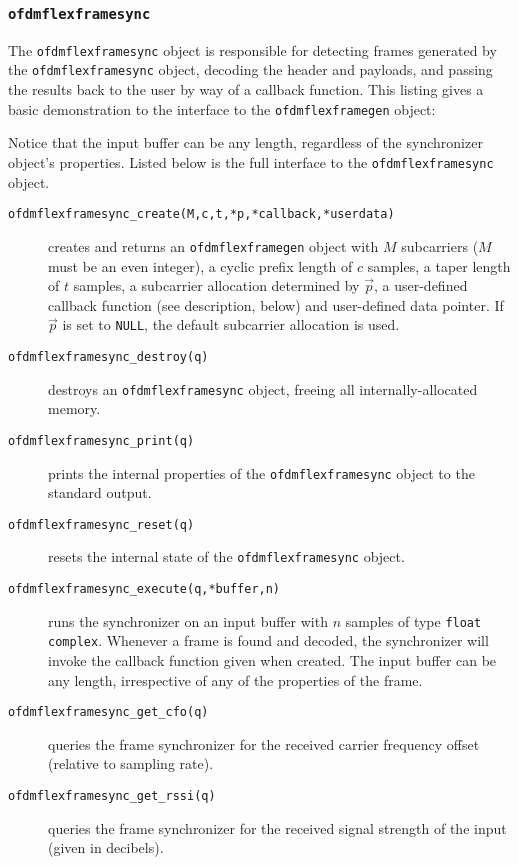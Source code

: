 \subsubsection{{\tt ofdmflexframesync}}
\label{module:framing:ofdmflexframe:sync}
%
The {\tt ofdmflexframesync} object is responsible for detecting frames
generated by the {\tt ofdmflexframesync} object, decoding the header and
payloads, and passing the results back to the user by way of a callback
function.
%
This listing gives a basic demonstration to the interface to the
{\tt ofdmflexframegen} object:
%

%
Notice that the input buffer can be any length, regardless of the
synchronizer object's properties.
Listed below is the full interface to the {\tt ofdmflexframesync}
object.
%
\begin{description}
%
\item[{\tt ofdmflexframesync\_create(M,c,t,*p,*callback,*userdata)}]
    creates and returns an {\tt ofdmflexframegen} object
    with $M$ subcarriers ($M$ must be an even integer),
    a cyclic prefix length of $c$ samples,
    a taper length of $t$ samples,
    a subcarrier allocation determined by $\vec{p}$,
    a user-defined callback function (see description, below)
    and user-defined data pointer.
    If $\vec{p}$ is set to {\tt NULL}, the default subcarrier allocation
    is used.
%
\item[{\tt ofdmflexframesync\_destroy(q)}]
    destroys an {\tt ofdmflexframesync} object, freeing all
    internally-allocated memory.
%
\item[{\tt ofdmflexframesync\_print(q)}]
    prints the internal properties of the {\tt ofdmflexframesync}
    object to the standard output.
%
\item[{\tt ofdmflexframesync\_reset(q)}]
    resets the internal state of the {\tt ofdmflexframesync} object.
%
\item[{\tt ofdmflexframesync\_execute(q,*buffer,n)}]
    runs the synchronizer on an input buffer with $n$ samples of type
    {\tt float complex}.
    Whenever a frame is found and decoded, the synchronizer will invoke
    the callback function given when created.
    The input buffer can be any length, irrespective of any of the
    properties of the frame.
%
\item[{\tt ofdmflexframesync\_get\_cfo(q)}]
    queries the frame synchronizer for the received carrier frequency
    offset (relative to sampling rate).
%
\item[{\tt ofdmflexframesync\_get\_rssi(q)}]
    queries the frame synchronizer for the received signal strength of
    the input (given in decibels).
%
\end{description}
